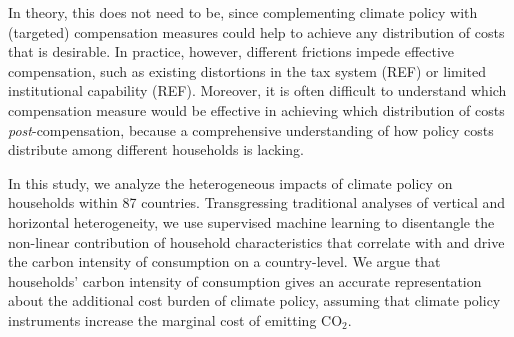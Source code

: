 \documentclass[12pt, a4paper]{article}
\begin{document}
In theory, this does not need to be, since complementing climate policy with (targeted) compensation measures could help to achieve any distribution of costs that is desirable. In practice, however, different frictions impede effective compensation, such as existing distortions in the tax system (REF) or limited institutional capability (REF). %
Moreover, it is often difficult to understand which compensation measure would be effective in achieving which distribution of costs \textit{post}-compensation, because a comprehensive understanding of how policy costs distribute among different households is lacking.

In this study, we analyze the heterogeneous impacts of climate policy on households within 87 countries. Transgressing traditional analyses of vertical and horizontal heterogeneity, we use supervised machine learning to disentangle the non-linear contribution of household characteristics that correlate with and drive the carbon intensity of consumption on a country-level. We argue that households' carbon intensity of consumption gives an accurate representation about the additional cost burden of climate policy, assuming that climate policy instruments increase the marginal cost of emitting CO$_{2}$.

\end{document}
